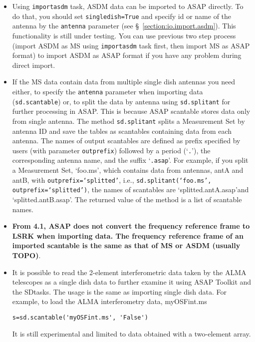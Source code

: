 \begin{itemize}
\item Using {\tt importasdm} task, ASDM data can be imported to ASAP directly.
To do that, you should set {\tt singledish=True} and specify id or name of 
the antenna by the {\tt antenna} parameter 
(see \S~\ref{section:io.import.asdm}). This functionality is still under 
testing. You can use previous two step process (import ASDM as MS using 
{\tt importasdm} task first, then import MS as ASAP format) to import ASDM 
as ASAP format if you have any problem during direct import. 

\item If the MS data contain data from multiple single dish antennas you need either, 
to specify the {\tt antenna} parameter when importing data ({\tt sd.scantable}) or, 
to split the data by antenna using {\tt sd.splitant} for further processing in ASAP. 
This is because ASAP scantable stores data only from single antenna.
The method {\tt sd.splitant} splits a Measurement Set by antenna ID
and save the tables as scantables containing data from each antenna. 
The names of output scantables are defined as prefix specified by
users (with parameter {\tt outprefix}) followed by a period (\lq {\tt .}\rq), 
the corresponding antenna name, and the suffix \lq {\tt .asap}\rq. 
For example, if you split a Measurement Set, \lq foo.ms\rq, 
which contains data from antennas, antA and antB,
with {\tt outprefix=\lq splitted\rq}, 
i.e., {\tt sd.splitant(\lq foo.ms\rq, outprefix=\lq splitted\rq)}, 
the names of scantables are \lq splitted.antA.asap\rq and
\lq splitted.antB.asap\rq.  
The returned value of the method is a list of scantable names. 
\item {\bf From 4.1, ASAP does not convert the frequency 
reference frame to LSRK when importing data. 
The frequency reference frame of an imported scantable is the 
same as that of MS or ASDM (usually TOPO)}.
\item It is possible to read the 2-element interferometric
data taken by the ALMA telescopes 
as a single dish data to further examine it using ASAP Toolkit and
the SDtasks. The usage is the same as importing single
dish data. 
For example, to load the ALMA interferometry data, myOSFint.ms
\begin{verbatim} 
s=sd.scantable('myOSFint.ms', 'False')
\end{verbatim} 
It is still experimental and limited to data obtained with a
two-element array.


\end{itemize}
